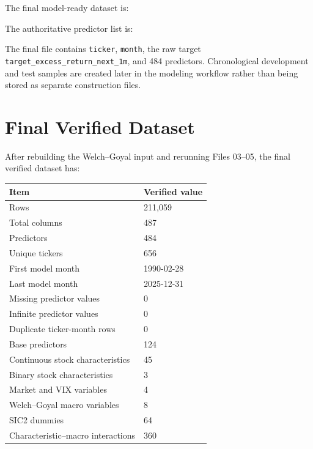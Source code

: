 \documentclass[11pt,a4paper]{article}
\newcommand{\code}[1]{\texttt{#1}}
\newcommand{\target}{\code{target\_excess\_return\_next\_1m}}
\begin{document}
The final model-ready dataset is:
\begin{center}
\end{center}

The authoritative predictor list is:
\begin{center}
\end{center}

The final file contains \code{ticker}, \code{month}, the raw target \target, and 484 predictors. Chronological development and test samples are created later in the modeling workflow rather than being stored as separate construction files.

\section{Final Verified Dataset}

After rebuilding the Welch--Goyal input and rerunning Files 03--05, the final verified dataset has:

\begin{center}
\begin{tabularx}{0.84\textwidth}{p{6.0cm}Y}
\toprule
Item & Verified value \\
\midrule
Rows & 211,059 \\
Total columns & 487 \\
Predictors & 484 \\
Unique tickers & 656 \\
First model month & 1990-02-28 \\
Last model month & 2025-12-31 \\
Missing predictor values & 0 \\
Infinite predictor values & 0 \\
Duplicate ticker-month rows & 0 \\
Base predictors & 124 \\
Continuous stock characteristics & 45 \\
Binary stock characteristics & 3 \\
Market and VIX variables & 4 \\
Welch--Goyal macro variables & 8 \\
SIC2 dummies & 64 \\
Characteristic--macro interactions & 360 \\
\bottomrule
\end{tabularx}
\end{center}
\end{document}
